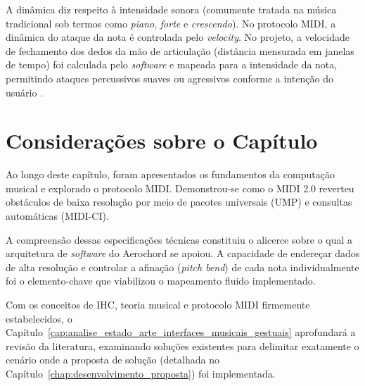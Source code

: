 A dinâmica diz respeito à intensidade sonora (comumente tratada na música tradicional sob termos como \textit{piano}, \textit{forte} e \textit{crescendo}). No protocolo MIDI, a dinâmica do ataque da nota é controlada pelo \textit{velocity}. No projeto, a velocidade de fechamento dos dedos da mão de articulação (distância mensurada em janelas de tempo) foi calculada pelo \textit{software} e mapeada para a intensidade da nota, permitindo ataques percussivos suaves ou agressivos conforme a intenção do usuário \cite{benward2014music}.

\section{Considerações sobre o Capítulo}
\label{sec:consideracoes_cap3}

Ao longo deste capítulo, foram apresentados os fundamentos da computação musical e explorado o protocolo MIDI. Demonstrou-se como o MIDI 2.0 reverteu obstáculos de baixa resolução por meio de pacotes universais (UMP) e consultas automáticas (MIDI-CI).

A compreensão dessas especificações técnicas constituiu o alicerce sobre o qual a arquitetura de \textit{software} do Aerochord se apoiou. A capacidade de endereçar dados de alta resolução e controlar a afinação (\textit{pitch bend}) de cada nota individualmente foi o elemento-chave que viabilizou o mapeamento fluido implementado.

Com os conceitos de IHC, teoria musical e protocolo MIDI firmemente estabelecidos, o Capítulo~\ref{cap:analise_estado_arte_interfaces_musicais_gestuais} aprofundará a revisão da literatura, examinando soluções existentes para delimitar exatamente o cenário onde a proposta de solução (detalhada no Capítulo~\ref{chap:desenvolvimento_proposta}) foi implementada.